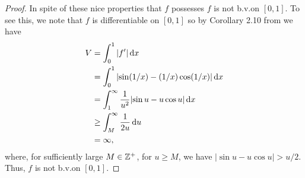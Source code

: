 \begin{proof}
  In spite of these nice properties that $f$ possesses $f$ is not b.v.\@ on
  $[0,1]$. To see this, we note that $f$ is differentiable on $[0,1]$ so by
  Corollary 2.10 from \cite[Ch.\@ 2, p.\@ 23]{wheeden-zygmund} we have
  \begin{equation}
    \label{eq:1:2}
    \begin{aligned}
      V&=\int_0^1|f'|\mathop{}\!\mathrm{d} x\\
      &=\int_0^1|{\sin(1/x)-(1/x)\cos(1/x)}|\mathop{}\!\mathrm{d} x\\
      &=\int_1^\infty\frac{1}{u^2}|{\sin u-u\cos u}|\mathop{}\!\mathrm{d} x\\
      &\geq\int_M^\infty \frac{1}{2u}\mathop{}\!\mathrm{d} u\\
      &=\infty,
    \end{aligned}
  \end{equation}
  where, for sufficiently large $M\in\mathbb{Z}^+$, for $u\geq M$, we have
  $|{\sin u- u\cos u}|>u/2$. Thus, $f$ is not b.v.\@ on $[0,1]$.
\end{proof}

